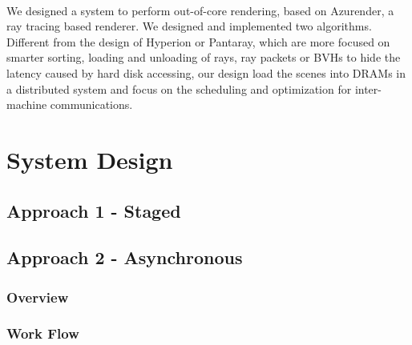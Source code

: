 \documentclass[a4paper, oneside, 10pt]{article}
\begin{document}
\paragraph{} We designed a system to perform out-of-core rendering, based on Azurender, a ray tracing based renderer. We designed and implemented two algorithms. Different from the design of Hyperion or Pantaray, which are more focused on smarter sorting, loading and unloading of rays, ray packets or BVHs to hide the latency caused by hard disk accessing, our design load the scenes into DRAMs in a distributed system and focus on the scheduling and optimization for inter-machine communications. 

\section{System Design}
\subsection{Approach 1 - Staged}
\subsection{Approach 2 - Asynchronous}
\subsubsection{Overview}
\subsubsection{Work Flow}
\end{document}
